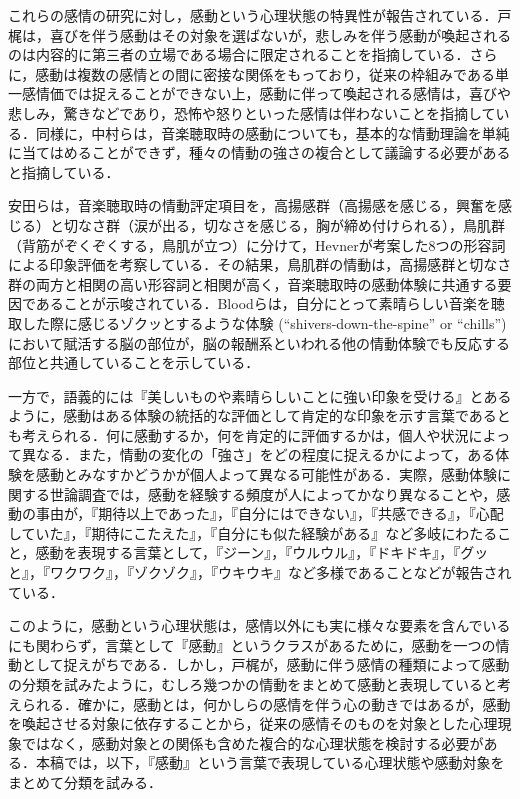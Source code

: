 \documentclass[japanese]{jnlp_1.3c}
\begin{document}
これらの感情の研究に対し，感動という心理状態の特異性が報告されている．戸梶\cite{Article_006}は，喜びを伴う感動はその対象を選ばないが，悲しみを伴う感動が喚起されるのは内容的に第三者の立場である場合に限定されることを指摘している．さらに，感動は複数の感情との間に密接な関係をもっており，従来の枠組みである単一感情価では捉えることができない上，感動に伴って喚起される感情は，喜びや悲しみ，驚きなどであり，恐怖や怒りといった感情は伴わないことを指摘している．同様に，中村ら\cite{Inproc_203}は，音楽聴取時の感動についても，基本的な情動理論を単純に当てはめることができず，種々の情動の強さの複合として議論する必要があると指摘している．


安田ら\cite{Inproc_205}は，音楽聴取時の情動評定項目を，高揚感群（高揚感を感じる，興奮を感じる）と切なさ群（涙が出る，切なさを感じる，胸が締め付けられる），鳥肌群（背筋がぞくぞくする，鳥肌が立つ）に分けて，Hevner\cite{Article_003}が考案した8つの形容詞による印象評価を考察している．その結果，鳥肌群の情動は，高揚感群と切なさ群の両方と相関の高い形容詞と相関が高く，音楽聴取時の感動体験に共通する要因であることが示唆されている．Bloodら\cite{Article_001}は，自分にとって素晴らしい音楽を聴取した際に感じるゾクッとするような体験 (``shivers-down-the-spine'' or ``chills'') において賦活する脳の部位が，脳の報酬系といわれる他の情動体験でも反応する部位と共通していることを示している．


一方で，語義的には『美しいものや素晴らしいことに強い印象を受ける』とあるように，感動はある体験の統括的な評価として肯定的な印象を示す言葉であるとも考えられる．何に感動するか，何を肯定的に評価するかは，個人や状況によって異なる．また，情動の変化の「強さ」をどの程度に捉えるかによって，ある体験を感動とみなすかどうかが個人よって異なる可能性がある．実際，感動体験に関する世論調査\cite{Web_401}では，感動を経験する頻度が人によってかなり異なることや，感動の事由が，『期待以上であった』，『自分にはできない』，『共感できる』，『心配していた』，『期待にこたえた』，『自分にも似た経験がある』など多岐にわたること，感動を表現する言葉として，『ジーン』，『ウルウル』，『ドキドキ』，『グッと』，『ワクワク』，『ゾクゾク』，『ウキウキ』など多様であることなどが報告されている．


このように，感動という心理状態は，感情以外にも実に様々な要素を含んでいるにも関わらず，言葉として『感動』というクラスがあるために，感動を一つの情動として捉えがちである．しかし，戸梶\cite{Article_006}が，感動に伴う感情の種類によって感動の分類を試みたように，むしろ幾つかの情動をまとめて感動と表現していると考えられる．確かに，感動とは，何かしらの感情を伴う心の動きではあるが，感動を喚起させる対象に依存することから，従来の感情そのものを対象とした心理現象ではなく，感動対象との関係も含めた複合的な心理状態を検討する必要がある．本稿では，以下，『感動』という言葉で表現している心理状態や感動対象をまとめて分類を試みる．
\end{document}
